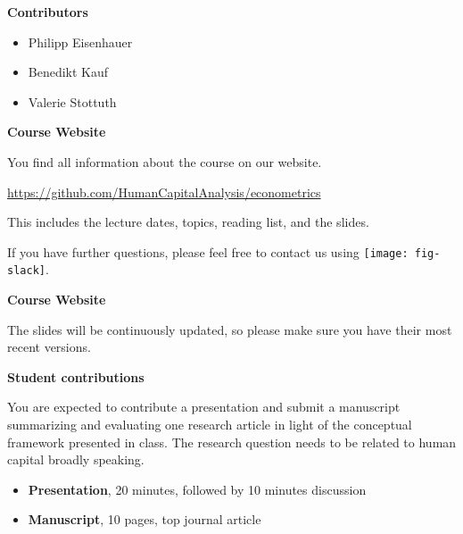 \begin{frame}\textbf{Contributors}\vspace{0.3cm}

\begin{itemize}\setlength\itemsep{1em}
\item Philipp Eisenhauer
\item Benedikt Kauf
\item Valerie Stottuth
\end{itemize}

\end{frame}
\begin{frame}
	\textbf{Course Website}\vspace{0.3cm}

You find all information about the course on our website.

\begin{center}
\url{https://github.com/HumanCapitalAnalysis/econometrics}
\end{center}

This includes the lecture dates, topics, reading list, and the slides.\vspace{0.3cm}

If you have further questions, please feel free to contact us using
\texttt{[image: fig-slack]}.

\end{frame}
\begin{frame}
	\textbf{Course Website}\vspace{0.3cm}

The slides will be continuously updated, so please make sure you have their most recent versions.

\end{frame}
\begin{frame}
	\textbf{Student contributions}\vspace{0.3cm}

You are expected to contribute a presentation and submit a manuscript summarizing and evaluating one research article in light of the conceptual framework presented in class. The research question needs to be related to human capital broadly speaking.

\begin{itemize}
\item \textbf{Presentation}, 20 minutes, followed by 10 minutes discussion
\item \textbf{Manuscript}, 10 pages, top journal article
\end{itemize}

\end{frame}
